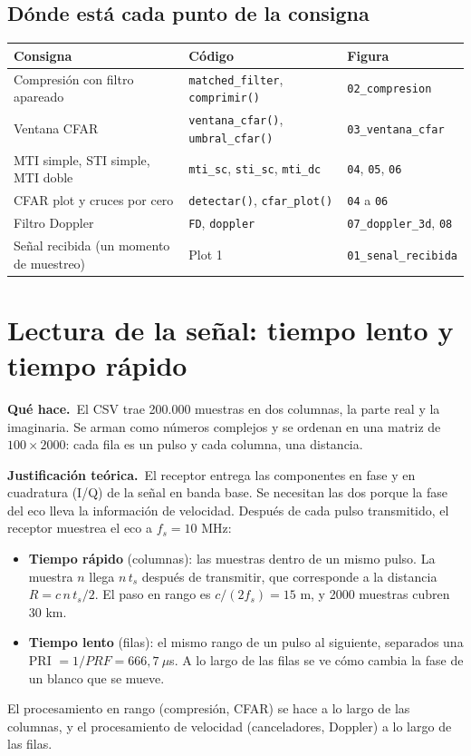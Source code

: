 \documentclass[11pt]{article}
\newcommand{\codigo}[2]{}
\newcommand{\teoria}{\par\textcolor{verde}{\textbf{Justificación teórica.}}\ }
\newcommand{\hace}{\par\textcolor{verde}{\textbf{Qué hace.}}\ }
\newcommand{\archivo}[1]{\texttt{#1}}
\begin{document}
\subsection{Dónde está cada punto de la consigna}
\begin{table}[H]
  \centering
  \small
  \begin{tabular}{p{5.8cm} p{4.6cm} l}
    \toprule
    \textbf{Consigna} & \textbf{Código} & \textbf{Figura} \\
    \midrule
    Compresión con filtro apareado & \archivo{matched\_filter}, \archivo{comprimir()} & \archivo{02\_compresion} \\
    Ventana CFAR & \archivo{ventana\_cfar()}, \archivo{umbral\_cfar()} & \archivo{03\_ventana\_cfar} \\
    MTI simple, STI simple, MTI doble & \archivo{mti\_sc}, \archivo{sti\_sc}, \archivo{mti\_dc} & \archivo{04}, \archivo{05}, \archivo{06} \\
    CFAR plot y cruces por cero & \archivo{detectar()}, \archivo{cfar\_plot()} & \archivo{04} a \archivo{06} \\
    Filtro Doppler & \archivo{FD}, \archivo{doppler} & \archivo{07\_doppler\_3d}, \archivo{08} \\
    Señal recibida (un momento de muestreo) & Plot 1 & \archivo{01\_senal\_recibida} \\
    \bottomrule
  \end{tabular}
\end{table}

\section{Lectura de la señal: tiempo lento y tiempo rápido}
\codigo{69}{71}
\hace El CSV trae 200.000 muestras en dos columnas, la parte real y la imaginaria. Se arman como números complejos y se ordenan en una matriz de $100 \times 2000$: cada fila es un pulso y cada columna, una distancia.

\teoria El receptor entrega las componentes en fase y en cuadratura (I/Q) de la señal en banda base. Se necesitan las dos porque la fase del eco lleva la información de velocidad. Después de cada pulso transmitido, el receptor muestrea el eco a $f_s = 10$ MHz:
\begin{itemize}
  \item \textbf{Tiempo rápido} (columnas): las muestras dentro de un mismo pulso. La muestra $n$ llega $n\,t_s$ después de transmitir, que corresponde a la distancia $R = c\,n\,t_s/2$. El paso en rango es $c/(2f_s) = 15$ m, y 2000 muestras cubren 30 km.
  \item \textbf{Tiempo lento} (filas): el mismo rango de un pulso al siguiente, separados una PRI $= 1/PRF = 666{,}7\ \mu$s. A lo largo de las filas se ve cómo cambia la fase de un blanco que se mueve.
\end{itemize}
El procesamiento en rango (compresión, CFAR) se hace a lo largo de las columnas, y el procesamiento de velocidad (canceladores, Doppler) a lo largo de las filas.
\end{document}
